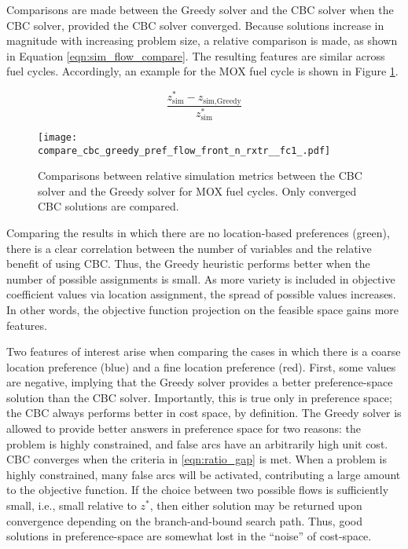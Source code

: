 Comparisons are made between the Greedy solver and the CBC solver when the CBC
solver, provided the CBC solver converged. Because solutions increase in
magnitude with increasing problem size, a relative comparison is made, as shown
in Equation \ref{eqn:sim_flow_compare}. The resulting features are similar
across fuel cycles. Accordingly, an example for the MOX fuel cycle is shown in
Figure \ref{fig:compare_cbc_greedy_pref_flow_front_n_rxtr__fc1_}.

\begin{equation}\label{eqn:sim_flow_compare}
\frac{z^*_{\text{sim}} - z_{\text{sim}, \text{Greedy}}}
     {z^*_{\text{sim}}} 
\end{equation}

\begin{figure}[h!]
  \begin{center}
    \texttt{[image: compare\_cbc\_greedy\_pref\_flow\_front\_n\_rxtr\_\_fc1\_.pdf]}
    \caption{
      \label{fig:compare_cbc_greedy_pref_flow_front_n_rxtr__fc1_}
      Comparisons between relative simulation metrics between the CBC solver and
      the Greedy solver for MOX fuel cycles. Only converged CBC
      solutions are compared.  }
  \end{center}
\end{figure}

Comparing the results in which there are no location-based preferences (green),
there is a clear correlation between the number of variables and the relative
benefit of using CBC. Thus, the Greedy heuristic performs better when the number
of possible assignments is small. As more variety is included in objective
coefficient values via location assignment, the spread of possible values
increases. In other words, the objective function projection on the feasible
space gains more features.

Two features of interest arise when comparing the cases in which there is a
coarse location preference (blue) and a fine location preference (red). First,
some values are negative, implying that the Greedy solver provides a better
preference-space solution than the CBC solver. Importantly, this is true only in
preference space; the CBC always performs better in cost space, by
definition. The Greedy solver is allowed to provide better answers in preference
space for two reasons: the problem is highly constrained, and false arcs have an
arbitrarily high unit cost. CBC converges when the criteria in
\ref{eqn:ratio_gap} is met. When a problem is highly constrained, many false
arcs will be activated, contributing a large amount to the objective
function. If the choice between two possible flows is sufficiently small, i.e.,
small relative to $z^*$, then either solution may be returned upon convergence
depending on the branch-and-bound search path. Thus, good solutions in
preference-space are somewhat lost in the ``noise'' of cost-space.

